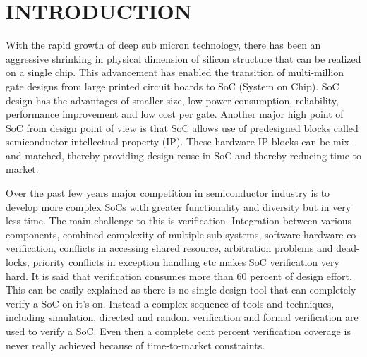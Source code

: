 \chapter{INTRODUCTION}

With the rapid growth of deep sub micron technology, there has been an aggressive shrinking in physical dimension of silicon structure that can be realized on a single chip. This advancement has enabled the transition of multi-million gate designs from large printed circuit boards to SoC (System on Chip). SoC design has the advantages of smaller size, low power consumption, reliability, performance improvement and low cost per gate. Another major high point of SoC from design point of view is that SoC allows use of predesigned blocks called semiconductor intellectual property (IP). These hardware IP blocks can be mix-and-matched, thereby providing design reuse in SoC and thereby reducing time-to market. 


 Over the past few years major competition in semiconductor industry is to develop more complex SoCs with greater functionality and diversity but in very less time. The main challenge to this is verification. Integration between various components, combined complexity of multiple sub-systems, software-hardware co-verification, conflicts in accessing shared resource, arbitration problems and dead-locks, priority conflicts in exception handling etc makes SoC verification very hard. It is said that verification consumes more than 60 percent of design effort. This can be easily explained as there is no single design tool that can completely verify a SoC on it's on. Instead a complex sequence of tools and techniques, including simulation, directed and random verification and formal verification are used to verify a SoC. Even then a complete cent percent verification coverage is never really achieved because of time-to-market constraints.


